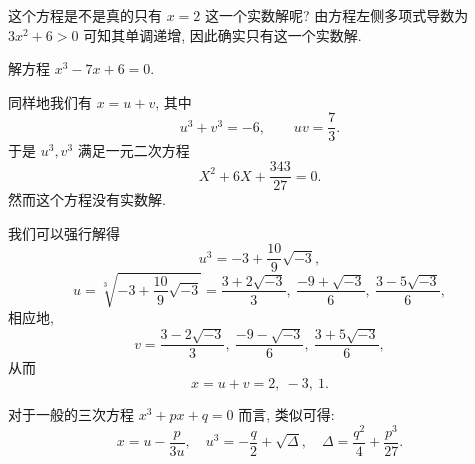 这个方程是不是真的只有 $x=2$ 这一个实数解呢?
由方程左侧多项式导数为 $3x^2+6>0$ 可知其单调递增, 因此确实只有这一个实数解.

\begin{example}
  解方程 $x^3-7x+6=0$.
\end{example}

\begin{solution}
  同样地我们有 $x=u+v$, 其中
  \[
    u^3+v^3=-6,\qquad uv=\frac73.
  \]
  于是 $u^3,v^3$ 满足一元二次方程
  \[
    X^2+6X+\frac{343}{27}=0.
  \]
  然而这个方程没有实数解.

  我们可以强行解得
  \[
    u^3=-3+\frac{10}9\sqrt{-3},
  \]
  \[
    u=\sqrt[3]{-3+\frac{10}9\sqrt{-3}}
     =\frac{3+2\sqrt{-3}}3,\ 
      \frac{-9+\sqrt{-3}}6,\ 
      \frac{3-5\sqrt{-3}}6,
  \]
  相应地,
  \[
    v=\frac{3-2\sqrt{-3}}3,\ 
      \frac{-9-\sqrt{-3}}6,\ 
      \frac{3+5\sqrt{-3}}6,
  \]
  从而
  \[
    x=u+v=2,\ -3,\ 1.
  \]
\end{solution}

对于一般的三次方程 $x^3+px+q=0$ 而言, 类似可得:
\[
  x=u-\frac p{3u},\quad
  u^3=-\frac q2+\sqrt{\Delta},\quad
  \Delta=\frac{q^2}4+\frac{p^3}{27}.
\]



